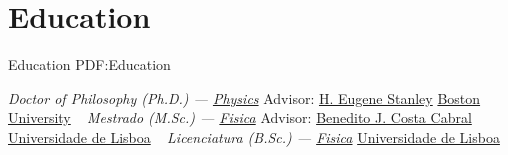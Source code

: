 \section
{Education}
{Education}
{PDF:Education}

\textit{Doctor of Philosophy (Ph.D.) --- \href{http://physics.bu.edu/}{Physics}}
    \newline
    Advisor: \href{http://physics.bu.edu/people/show/68}{H. Eugene Stanley}
\newline
\href{http://www.bu.edu/}{Boston University}
\newline
~
\Gap
{}
\textit{Mestrado (M.Sc.) --- \href{https://ciencias.ulisboa.pt/en/physics}{Fisica}}
    \newline
    Advisor: \href{https://ciencias.ulisboa.pt/pt/perfil/bjcabral}{Benedito J. Costa Cabral}
\newline
\href{https://www.ulisboa.pt/}{Universidade de Lisboa}
\newline
~
\Gap
{}
\textit{Licenciatura (B.Sc.) --- \href{https://ciencias.ulisboa.pt/en/physics}{Fisica}}
\newline
\href{https://www.ulisboa.pt/}{Universidade de Lisboa}
\newline
~
\Gap
\vspace*{0.2cm}